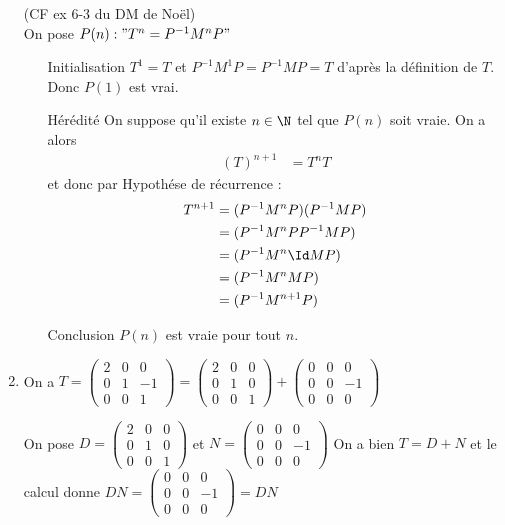 \begin{correction}
\begin{enumerate}
(CF ex 6-3 du DM de Noël) \\

On pose $P(n) : "T^n =P^{-1} M^n P"$
\begin{itemize}
\item[Initialisation] 
$T^1 =T$ et $P^{-1} M^1 P= P^{-1} M P=T$ d'après la définition de $T$.
Donc $P(1) $ est vrai. 

\item[Hérédité] On suppose qu'il existe $n\in \N$ tel que $P(n)$ soit vraie. 
On a alors 
\begin{align*}
 (T)^{n+1}&=  T^n  T
\end{align*}
et donc par Hypothése de récurrence : 
\begin{align*}
 T^{n+1}&=  (P^{-1}M^n P )  (P^{-1}M P )\\
 							&=  (P^{-1}M^n P  P^{-1}M P )\\
 							&=  (P^{-1}M^n \Id M P )\\
 							&=  (P^{-1}M^n M P )\\
 							&=  (P^{-1}M^{n+1} P )
\end{align*}
\item[Conclusion] $P(n)$ est vraie pour tout $n$. 




\end{itemize}
\item On a 
$T= \left(\begin{array}{ccc}  
2&0&0 \\
0 &1&-1 \\
0&0&1 
\end{array}\right)  = \left(\begin{array}{ccc}  
2&0&0 \\
 0&1&0 \\
0&0&1 
\end{array}\right) + \left(\begin{array}{ccc}  
0&0&0 \\
0 &0&-1 \\
0&0&0 
\end{array}\right)  $  

On pose $D= \left(\begin{array}{ccc}  
2&0&0 \\
 0&1&0 \\
0&0&1 
\end{array}\right) $ et $N= \left(\begin{array}{ccc}  
0&0&0 \\
 0&0&-1 \\
0&0&0 
\end{array}\right)  $ 
On a bien $T =D+N$ et  le calcul donne 
$DN = \left(\begin{array}{ccc}  
0&0&0 \\
0 &0&-1 \\
0&0&0 
\end{array}\right) =DN $ 



\end{enumerate}
\end{correction}
